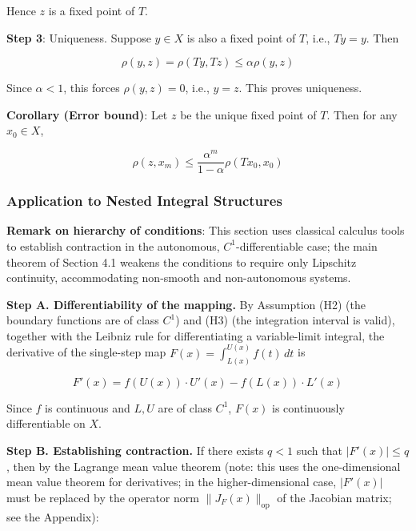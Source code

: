 \documentclass[11pt,a4paper]{amsart}
\begin{document}
Hence $z$ is a fixed point of $T$.

\textbf{Step 3}: Uniqueness. Suppose $y \in X$ is also a fixed point of $T$, i.e., $Ty = y$. Then

\begin{equation}
\rho(y, z) = \rho(Ty, Tz) \le \alpha \rho(y, z)
\end{equation}

Since $\alpha < 1$, this forces $\rho(y, z) = 0$, i.e., $y = z$. This proves uniqueness.

\textbf{Corollary (Error bound)}: Let $z$ be the unique fixed point of $T$. Then for any $x_0 \in X$,

\begin{equation}
\label{eq:banach-error}
\rho(z, x_m) \le \frac{\alpha^m}{1-\alpha} \rho(Tx_0, x_0)
\end{equation}

\subsubsection*{Application to Nested Integral Structures}

\textbf{Remark on hierarchy of conditions}: This section uses classical calculus tools to establish contraction in the autonomous, $C^1$-differentiable case; the main theorem of Section 4.1 weakens the conditions to require only Lipschitz continuity, accommodating non-smooth and non-autonomous systems.

\textbf{Step A. Differentiability of the mapping.} By Assumption (H2) (the boundary functions are of class $C^1$) and (H3) (the integration interval is valid), together with the Leibniz rule for differentiating a variable-limit integral, the derivative of the single-step map $F(x) = \int_{L(x)}^{U(x)} f(t) \, dt$ is

\begin{equation}
F'(x) = f(U(x)) \cdot U'(x) - f(L(x)) \cdot L'(x)
\end{equation}

Since $f$ is continuous and $L, U$ are of class $C^1$, $F(x)$ is continuously differentiable on $X$.

\textbf{Step B. Establishing contraction.} If there exists $q < 1$ such that $|F'(x)| \le q$, then by the Lagrange mean value theorem (note: this uses the one-dimensional mean value theorem for derivatives; in the higher-dimensional case, $|F'(x)|$ must be replaced by the operator norm $\|J_F(x)\|_{\mathrm{op}}$ of the Jacobian matrix; see the Appendix):
\end{document}
